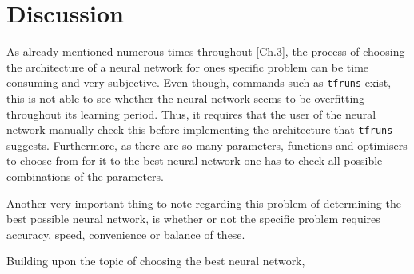 \chapter{Discussion}\label{Ch.Discussion}
As already mentioned numerous times throughout \autoref{Ch.3}, the process of choosing the architecture of a neural network for ones specific problem can be time consuming and very subjective. Even though, commands such as \lstinline{tfruns} exist, this is not able to see whether the neural network seems to be overfitting throughout its learning period. Thus, it requires that the user of the neural network manually check this before implementing the architecture that \lstinline{tfruns} suggests. Furthermore, as there are so many parameters, functions and optimisers to choose from for it to the best neural network one has to check all possible combinations of the parameters. 

Another very important thing to note regarding this problem of determining the best possible neural network, is whether or not the specific problem requires accuracy, speed, convenience or balance of these.

Building upon the topic of choosing the best neural network,

